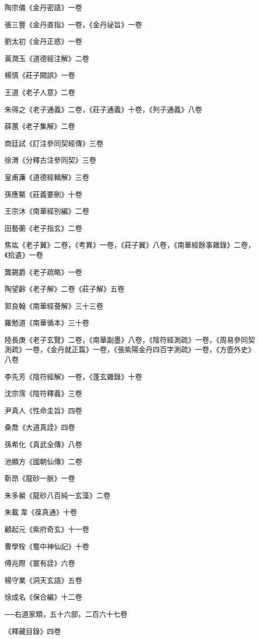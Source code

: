 陶宗儀《金丹密語》一卷

張三豐《金丹直指》一卷，《金丹祕旨》一卷

劉太初《金丹正惑》一卷

黃潤玉《道德經注解》二卷

楊慎《莊子闕誤》一卷

王道《老子人意》二卷

朱得之《老子通義》二卷，《莊子通義》十卷，《列子通義》八卷

薛蕙《老子集解》二卷

商廷試《訂注參同契經傳》三卷

徐渭《分釋古注參同契》三卷

皇甫濂《道德經輯解》三卷

孫應鰲《莊義要刪》十卷

王宗沐《南華經別編》二卷

田藝蘅《老子指玄》二卷

焦竑《老子翼》二卷，《考異》一卷，《莊子翼》八卷，《南華經餘事雜錄》二卷，《拾遺》一卷

龔錫爵《老子疏略》一卷

陶望齡《老子解》二卷《莊子解》五卷

郭良翰《南華經薈解》三十三卷

羅勉道《南華循本》三十卷

陸長庚《老子玄覽》二卷，《南華副墨》八卷，《陰符經測疏》一卷，《周易參同契測疏》一卷，《金丹就正篇》一卷，《張紫陽金丹四百字測疏》一卷，《方壺外史》八卷

李先芳《陰符經解》一卷，《蓬玄雜錄》十卷

沈宗霈《陰符釋義》三卷

尹真人《性命圭旨》四卷

桑喬《大道真詮》四卷

孫希化《真武全傳》八卷

池顯方《國朝仙傳》二卷

靳昂《龍砂一脈》一卷

朱多鱟《龍砂八百純一玄藻》二卷

朱載韋《葆真通》十卷

顧起元《紫府奇玄》十一卷

曹學牷《蜀中神仙記》十卷

傅兆際《寰有詮》六卷

楊守業《洞天玄語》五卷

徐成名《保合編》十二卷

──右道家類，五十六部，二百六十七卷

《釋藏目錄》四卷

